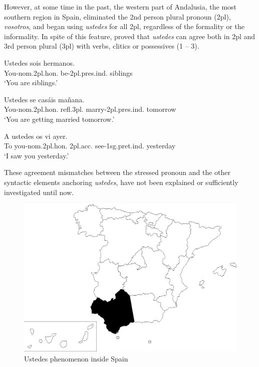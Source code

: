 \documentclass[output=paper]{LSP/langsci}
\begin{document}
However, at some time in the past, the western part of Andalusia, the most southern region in Spain, eliminated the 2nd person plural pronoun (2pl), \textit{vosotros}, and began using \textit{ustedes} for all 2pl, regardless of the formality or the informality. In spite of this feature, \citet{lara_uso_2010} proved that \textit{ustedes} can agree both in 2pl and 3rd person plural (3pl) with verbs, clitics or possessives (1 – 3).

\ea
\gll Ustedes sois hermanos.\\
 You-nom.2pl.hon. be-2pl.pres.ind. siblings\\
\glt`You are siblings.'
\z

\ea
\gll Ustedes se casáis mañana.\\
 You-nom.2pl.hon. refl.3pl. marry-2pl.pres.ind. tomorrow\\
\glt ‘You are getting married tomorrow.’\\
\z

\ea
\gll A ustedes os vi ayer.\\
 To you-nom.2pl.hon. 2pl.acc. see-1sg.pret.ind.   yesterday\\
\glt ‘I saw you yesterday.’\\
\z

These agreement mismatches between the stressed pronoun and the other syntactic elements anchoring \textit{ustedes}, have not been explained or sufficiently investigated until now.

\begin{figure}
\includegraphics[width=\textwidth]{illustrations/lara_fig1}
\caption{Ustedes phenomenon inside Spain}
\label{fig1}
\end{figure}
\end{document}
